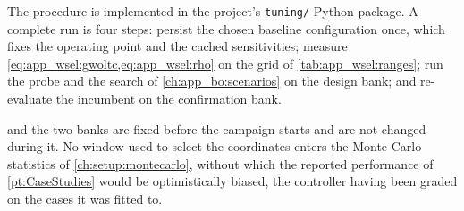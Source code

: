 The procedure is implemented in the project's \texttt{tuning/} Python package.
A complete run is four steps: persist the chosen baseline configuration once, which fixes the operating point and the cached sensitivities; measure \cref{eq:app_wsel:gwoltc,eq:app_wsel:rho} on the grid of \cref{tab:app_wsel:ranges}; run the probe and the search of \cref{ch:app_bo:scenarios} on the design bank; and re-evaluate the incumbent on the confirmation bank.

 and the two banks are fixed before the campaign starts and are not changed during it.
No window used to select the coordinates enters the Monte-Carlo statistics of \cref{ch:setup:montecarlo}, without which the reported performance of \cref{pt:CaseStudies} would be optimistically biased, the controller having been graded on the cases it was fitted to.
